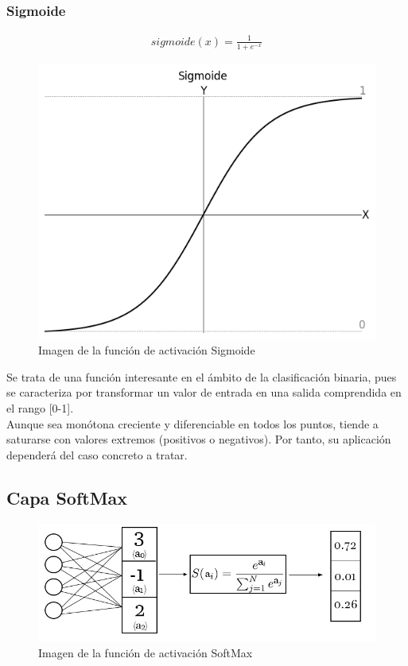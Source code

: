 \subsubsection{Sigmoide}

\begin{gather}
	sigmoide(x) = \frac{1}{1+e^{-x}}
\end{gather}

\begin{figure}[H]
	\centering
	\includegraphics[scale=0.45]{imagenes/sigmoide.jpg}  
	\caption{Imagen de la función de activación Sigmoide}
	\label{fig:Sigmoide}
\end{figure}

Se trata de una función interesante en el ámbito de la clasificación binaria, pues se caracteriza por transformar un valor de entrada en una salida comprendida en el rango [0-1]. \\
Aunque sea monótona creciente y diferenciable en todos los puntos, tiende a saturarse con valores extremos (positivos o negativos). Por tanto, su aplicación dependerá del caso concreto a tratar. \cite{Sigmoide}

\subsection{Capa SoftMax}

\begin{figure}[H]
	\centering
	\includegraphics[scale=0.35]{imagenes/softmax.jpg}  
	\caption{Imagen de la función de activación SoftMax}
	\label{fig:SoftMax}
\end{figure}

